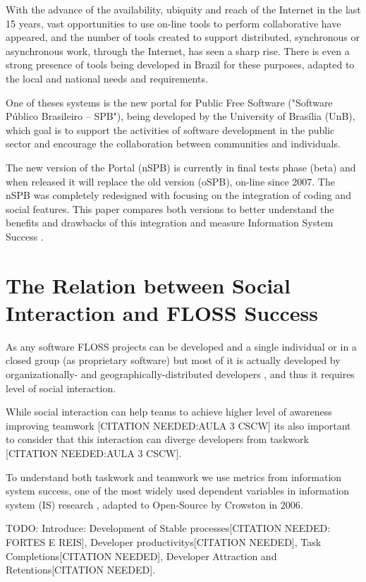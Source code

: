 \documentclass{sigchi}
\begin{document}
With the advance of the availability, ubiquity and reach of the Internet in the last 15 years, vast opportunities to use on-line tools to perform collaborative have appeared, and the number of tools created to support distributed, synchronous or asynchronous work, through the Internet, has seen a sharp rise. There is even a strong presence of tools being developed in Brazil for these purposes, adapted to the local and national needs and requirements.

One of theses systems is the new portal for Public Free Software ("Software Público Brasileiro – SPB"), being developed by the University of Brasília (UnB), which goal is to support the activities of software development in the public sector and encourage the collaboration between communities and individuals.

The new version of the Portal (nSPB) is currently in final tests phase (beta) and when released it will replace the old version (oSPB), on-line since 2007. The nSPB was completely redesigned with focusing on the integration of coding and social features. This paper compares both versions to better understand the benefits and drawbacks of this integration and measure Information System Success \cite{Crowston2006}.

\section{The Relation between Social Interaction and FLOSS Success}

As any software FLOSS projects can be developed and a single individual or in a closed group (as proprietary software) but most of it is actually developed by organizationally- and geographically-distributed developers \cite{Crowston2012}, and thus it requires level of social interaction.

While social interaction can help teams to achieve higher level of awareness improving teamwork [CITATION NEEDED:AULA 3 CSCW] its also important to consider that this interaction can diverge developers from taskwork [CITATION NEEDED:AULA 3 CSCW].

To understand both taskwork and teamwork we use metrics from information system success, one of the most widely used dependent variables in information system (IS) research \cite{Crowston2006}, adapted to Open-Source by Crowston in 2006.

TODO: Introduce: Development of Stable processes[CITATION NEEDED: FORTES E REIS], Developer productivitys[CITATION NEEDED], Task Completions[CITATION NEEDED], Developer Attraction and Retentions[CITATION NEEDED].
 
\end{document}
